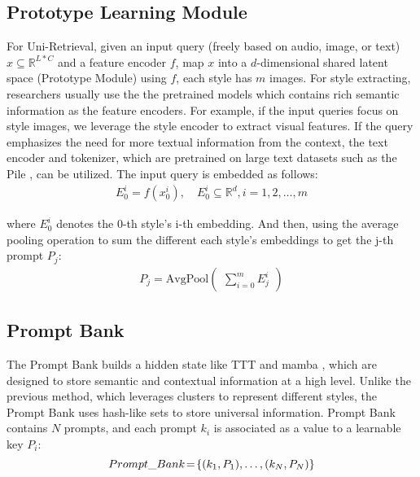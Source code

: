 \subsection{Prototype Learning Module} \label{subsec:prototype}
For Uni-Retrieval, given an input query (freely based on audio, image, or text) \( x \subseteq \mathbb{R}^{L*C} \) and a feature encoder \( f \), map \( x \) into a \( d \)-dimensional shared latent space (Prototype Module) using \( f \), each style has $m$ images. 
For style extracting, researchers usually use the the pretrained models which contains rich semantic information as the feature encoders. For example, if the input queries focus on style images, we leverage the style encoder \cite{styler} to extract visual features. 
If the query emphasizes the need for more textual information from the context, the text encoder and tokenizer, which are pretrained on large text datasets such as the Pile \cite{pile}, can be utilized.
The input query is embedded as follows:
{\setlength{\abovedisplayskip}{5pt}
\setlength{\belowdisplayskip}{5pt}
\begin{eqnarray}
E_{0}^{i} = f(x_{0}^{i}), \quad E_{0}^{i}\subseteq \mathbb R^{d},i=1,2,\dots,m
\end{eqnarray}}

\noindent where $E_{0}^{i}$ denotes the 0-th style's i-th embedding. And then, using the average pooling operation to sum the different each style's embeddings to get the j-th prompt $P_j$:
{\setlength{\abovedisplayskip}{8pt}
\setlength{\belowdisplayskip}{5pt}
\begin{eqnarray}
    P_{j} = \mathrm{AvgPool}(\begin{matrix}\sum^{m}_{i=0}{E_{j}^{i}}\end{matrix})
\end{eqnarray}}

\subsection{Prompt Bank} \label{subsec:prompt_bank}
The Prompt Bank builds a hidden state like TTT \cite{TTT} and mamba \cite{gu2023mamba}, which are designed to store semantic and contextual information at a high level.
Unlike the previous method, which leverages clusters to represent different styles, the Prompt Bank uses hash-like sets to store universal information.
Prompt Bank contains $N$ prompts, and each prompt $k_i$ is associated as a value to a learnable key $P_i$:
{\setlength{\abovedisplayskip}{6pt}
\setlength{\belowdisplayskip}{6pt}
\begin{equation}\setlength{\itemsep}{0.5pt}
Prompt\_Bank \!=\! \{(k_1, P_1),\dots,(k_N, P_N)\}
\end{equation}}

